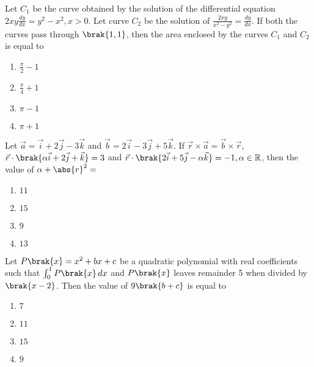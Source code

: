 \iffalse
    \title{2021}
    \author{EE24BTECH11002}
    \section{mcq-single}
\fi

    \item Let $C_1$ be the curve obtained by the solution of the differential equation $2xy\frac{dy}{dx} = y^2 - x^2, x > 0$. Let curve $C_2$ be the solution of $\frac{2xy}{x^2 - y^2} = \frac{dy}{dx}$. If both the curves pass through $\brak{1, 1}$, then the area enclosed by the curves $C_1$ and $C_2$ is equal to
    \hfill{}

	\begin{enumerate}
		\item $\frac{\pi}{2} - 1$
		\item $\frac{\pi}{4} + 1$
		\item $\pi - 1$
		\item $\pi + 1$
	\end{enumerate}

    \item Let $\vec{a} = \vec{i} + 2\vec{j} - 3\vec{k}$ and $\vec{b} = 2\vec{i} - 3\vec{j} + 5\vec{k}$. If $\vec{r} \times \vec{a} = \vec{b} \times \vec{r}$, $\vec{r} \cdot \brak{\alpha\vec{i} + 2\vec{j} + \vec{k}} = 3$ and $\vec{r} \cdot \brak{2\vec{i} + 5\vec{j} - \alpha\vec{k}} = -1, \alpha \in \mathbb{R}$, then the value of $\alpha + \abs{r}^2 = $
    \hfill{}

	\begin{enumerate}
		\item $11$ 
		\item $15$
		\item $9$
		\item $13$
	\end{enumerate}

    \item Let $P\brak{x} = x^2 + bx + c$ be a quadratic polynomial with real coefficients such that $\int_{0}^{1} P\brak{x} \, dx$ and $P\brak{x}$ leaves remainder 5 when divided by $\brak{x - 2}$. Then the value of $9\brak{b+c}$ is equal to
    \hfill{}

	\begin{enumerate}
		\item $7$ 
		\item $11$
		\item $15$
		\item $9$
	\end{enumerate}


